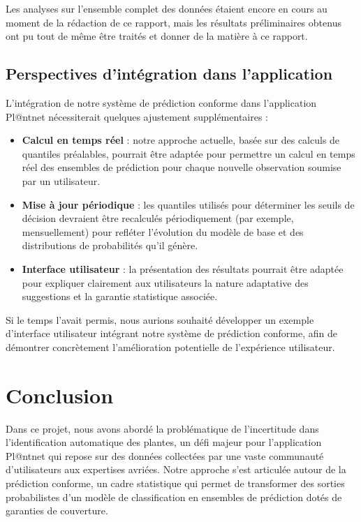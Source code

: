 \documentclass[a4paper,12pt]{article}
\begin{document}
Les analyses sur l'ensemble complet des données étaient encore en cours au moment de la rédaction de ce rapport, mais les résultats préliminaires obtenus ont pu tout de même être traités et donner de la matière à ce rapport.

\subsection{Perspectives d'intégration dans l'application}

L'intégration de notre système de prédiction conforme dans l'application Pl@ntnet nécessiterait quelques ajustement supplémentaires :
\begin{itemize}
    \item \textbf{Calcul en temps réel} : notre approche actuelle, basée sur des calculs de quantiles préalables, pourrait être adaptée pour permettre un calcul en temps réel des ensembles de prédiction pour chaque nouvelle observation soumise par un utilisateur.
    \item \textbf{Mise à jour périodique} : les quantiles utilisés pour déterminer les seuils de décision devraient être recalculés périodiquement (par exemple, mensuellement) pour refléter l'évolution du modèle de base et des distributions de probabilités qu'il génère.
    \item \textbf{Interface utilisateur} : la présentation des résultats pourrait être adaptée pour expliquer clairement aux utilisateurs la nature adaptative des suggestions et la garantie statistique associée.
\end{itemize}

\vspace{0.2cm}

Si le temps l'avait permis, nous aurions souhaité développer un exemple d'interface utilisateur intégrant notre système de prédiction conforme, afin de démontrer concrètement l'amélioration potentielle de l'expérience utilisateur.


\section{Conclusion}

Dans ce projet, nous avons abordé la problématique de l'incertitude dans l'identification automatique des plantes, un défi majeur pour l'application Pl@ntnet qui repose sur des données collectées par une vaste communauté d'utilisateurs aux expertises avriées. Notre approche s'est articulée autour de la prédiction conforme, un cadre statistique qui permet de transformer des sorties probabilistes d'un modèle de classification en ensembles de prédiction dotés de garanties de couverture.
\end{document}
